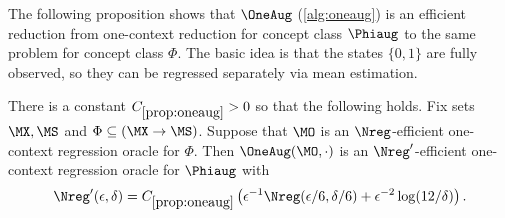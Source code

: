 The following proposition shows that $\OneAug$ (\cref{alg:oneaug}) is an efficient reduction from one-context reduction for concept class $\Phiaug$ to the same problem for concept class $\Phi$. The basic idea is that the states $\{0,1\}$ are fully observed, so they can be regressed separately via mean estimation.

\begin{proposition}\label{prop:oneaug}
There is a constant $C_{\ref{prop:oneaug}}>0$ so that the following holds. Fix sets $\MX,\MS$ and $\Phi \subseteq (\MX \to \MS)$. Suppose that $\MO$ is an $\Nreg$-efficient one-context regression oracle for $\Phi$. Then $\OneAug(\MO,\cdot)$ is an $\Nreg'$-efficient one-context regression oracle for $\Phiaug$ with
\[\Nreg'(\epsilon,\delta) = C_{\ref{prop:oneaug}}\left(\epsilon^{-1}\Nreg(\epsilon/6,\delta/6) + \epsilon^{-2}\log(12/\delta)\right).\]
\end{proposition}


